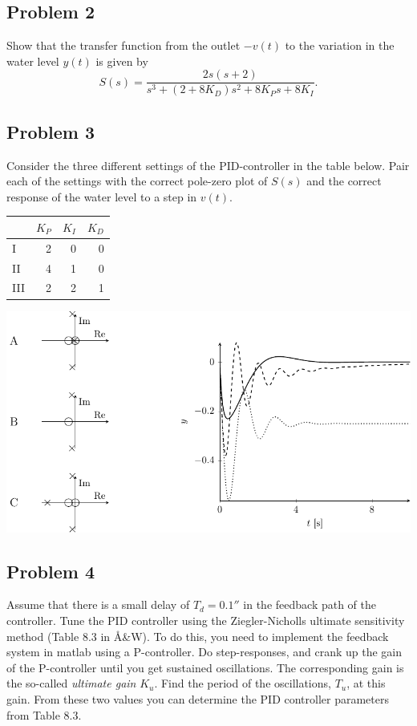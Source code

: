 \documentclass{scrartcl}
\begin{document}
\subsection*{Problem 2}
\label{sec:orgheadline3}
Show that the transfer function from the outlet \(-v(t)\) to the variation in the water level \(y(t)\) is given by 
\[ S(s) = \frac{2s(s+2)}{s^3 + (2+8K_D)s^2  + 8K_Ps + 8K_I}. \]

\subsection*{Problem 3}
\label{sec:orgheadline4}
Consider the three different settings of the PID-controller in the table below. Pair each of the settings with the correct pole-zero plot of \(S(s)\) and the correct response of the water level to a step in \(v(t)\). 

\begin{center}
\begin{tabular}{lrrr}
 & \(K_P\) & \(K_I\) & \(K_D\)\\
\hline
I & 2 & 0 & 0\\
\hline
II & 4 & 1 & 0\\
\hline
III & 2 & 2 & 1\\
\hline
\end{tabular}
\end{center}

\includegraphics[width=\linewidth]{tank-system-step-response}

\subsection*{Problem 4}
\label{sec:orgheadline5}
Assume that there is a small delay of \(T_d=\unit{0.1}{\second}\) in the feedback path of the controller. Tune the PID controller using the Ziegler-Nicholls ultimate sensitivity method (Table 8.3 in Å\&W). To do this, you need to implement the feedback system in matlab using a P-controller. Do step-responses, and crank up the gain of the P-controller until you get sustained oscillations. The corresponding gain is the so-called \emph{ultimate gain} \(K_u\). Find the period of the oscillations, \(T_u\), at this gain. From these two values you can determine the PID controller parameters from Table 8.3.
\end{document}
